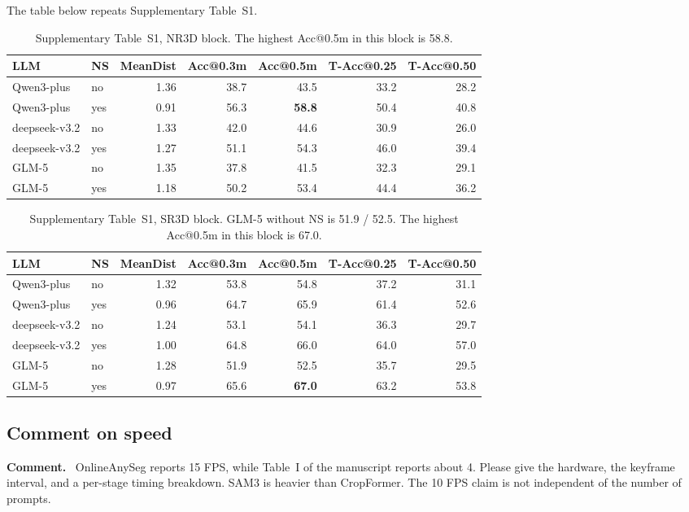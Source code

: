 \documentclass[11pt]{article}
\newcommand{\revcomment}[1]{%
  \par\vspace{0.6em}\noindent\textcolor{revblue}{\textbf{Comment.}}\ %
  \textcolor{revblue}{#1}\par\vspace{0.4em}}
\begin{document}
\noindent The table below repeats Supplementary Table~S1.

\begin{table}[ht]
\centering
\caption{Supplementary Table~S1, NR3D block. The highest Acc@0.5m in this block is 58.8.}
\label{tab:ablation-nr}
\small
\begin{tabular}{llrrrrr}
\toprule
LLM & NS & MeanDist & Acc@0.3m & Acc@0.5m & T-Acc@0.25 & T-Acc@0.50 \\
\midrule
Qwen3-plus & no & 1.36 & 38.7 & 43.5 & 33.2 & 28.2 \\
Qwen3-plus & yes & 0.91 & 56.3 & \textbf{58.8} & 50.4 & 40.8 \\
deepseek-v3.2 & no & 1.33 & 42.0 & 44.6 & 30.9 & 26.0 \\
deepseek-v3.2 & yes & 1.27 & 51.1 & 54.3 & 46.0 & 39.4 \\
GLM-5 & no & 1.35 & 37.8 & 41.5 & 32.3 & 29.1 \\
GLM-5 & yes & 1.18 & 50.2 & 53.4 & 44.4 & 36.2 \\
\bottomrule
\end{tabular}
\end{table}

\begin{table}[ht]
\centering
\caption{Supplementary Table~S1, SR3D block. GLM-5 without NS is 51.9 / 52.5. The highest Acc@0.5m in this block is 67.0.}
\label{tab:ablation-sr}
\small
\begin{tabular}{llrrrrr}
\toprule
LLM & NS & MeanDist & Acc@0.3m & Acc@0.5m & T-Acc@0.25 & T-Acc@0.50 \\
\midrule
Qwen3-plus & no & 1.32 & 53.8 & 54.8 & 37.2 & 31.1 \\
Qwen3-plus & yes & 0.96 & 64.7 & 65.9 & 61.4 & 52.6 \\
deepseek-v3.2 & no & 1.24 & 53.1 & 54.1 & 36.3 & 29.7 \\
deepseek-v3.2 & yes & 1.00 & 64.8 & 66.0 & 64.0 & 57.0 \\
GLM-5 & no & 1.28 & 51.9 & 52.5 & 35.7 & 29.5 \\
GLM-5 & yes & 0.97 & 65.6 & \textbf{67.0} & 63.2 & 53.8 \\
\bottomrule
\end{tabular}
\end{table}

\subsection*{Comment on speed}

\revcomment{OnlineAnySeg reports 15 FPS, while Table~I of the manuscript reports about 4. Please give the hardware, the keyframe interval, and a per-stage timing breakdown. SAM3 is heavier than CropFormer. The 10 FPS claim is not independent of the number of prompts.}
\end{document}
